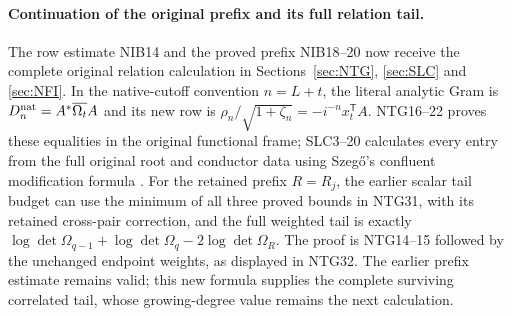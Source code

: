 \documentclass[11pt,a4paper]{article}
\begin{document}
\label{MTBUILD:CPQ_SIMULTANEOUS_RECEIVER:end}

\label{MTBUILD:NIB_TAIL_RECEIVER:start}
\paragraph{Continuation of the original prefix and its full relation tail.}
The row estimate NIB14 and the proved prefix NIB18--20 now receive the
complete original relation calculation in Sections~\ref{sec:NTG},
\ref{sec:SLC} and \ref{sec:NFI}. In the native-cutoff convention
$n=L+t$, the literal analytic Gram is
$D_n^{\rm nat}=A^*\overline{\Omega_t}A$ and its new row is
$\rho_n/\sqrt{1+\zeta_n}=-i^{-n}x_t^{\mathsf T}A$.
NTG16--22 proves these equalities in the original functional frame;
SLC3--20 calculates every entry from the full original root and
conductor data using Szeg\H{o}'s confluent modification formula
\cite[Theorem~2.5, pp.~29--30]{human:szego1975}.
For the retained prefix $R=R_j$, the earlier scalar tail budget can
use the minimum of all three
proved bounds in NTG31, with its retained cross-pair correction, and
the full weighted tail is exactly
$\log\det\Omega_{q-1}+\log\det\Omega_q-2\log\det\Omega_R$.
The proof is NTG14--15 followed by the unchanged endpoint weights,
as displayed in NTG32. The earlier prefix estimate remains valid;
this new formula supplies the complete surviving correlated tail,
whose growing-degree value remains the next calculation.

\label{MTBUILD:NIB_TAIL_RECEIVER:end}

\label{MTBUILD:IPR_SIMULTANEOUS_RECEIVER:start}
\end{document}
